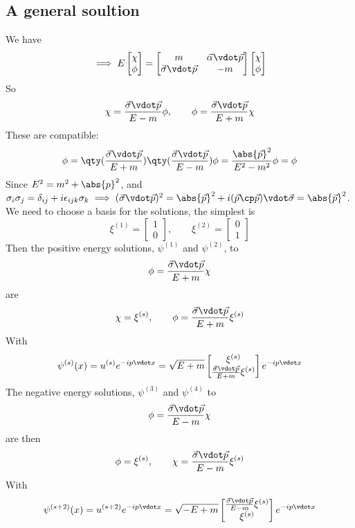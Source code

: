 \subsection{A general soultion}
\label{sec:general-soultion}
We have
\[ \implies E
\begin{bmatrix}
  \chi \\ \phi
\end{bmatrix}
=
\begin{bmatrix}
  m & \vec{\alpha} \vdot \vec{p} \\ \vec{\sigma} \vdot \vec{p} & -m
\end{bmatrix}
\begin{bmatrix}
  \chi \\ \phi
\end{bmatrix}
\]
So
\begin{equation*}
  \chi = \frac{\vec{\sigma} \vdot \vec{p}}{E-m} \phi, \qquad \phi = \frac{\vec{\sigma} \vdot \vec{p}}{E+m} \chi
\end{equation*}
These are compatible:
\begin{equation*}
  \phi = \qty( \frac{\vec{\sigma} \vdot \vec{p}}{E+m}) \qty( \frac{\vec{\sigma} \vdot \vec{p}}{E-m}) \phi = \frac{\abs{\vec{p}}^2}{E^2-m^2} \phi = \phi
\end{equation*}
Since $E^2 = m^2 + \abs{p}^2$, and $\sigma_i \sigma_j = \delta_{ij} +
i \epsilon_{ijk} \sigma_k \implies (\vec{\sigma} \vdot \vec{p})^2 =
\abs{\vec{p}}^2 + i (\vec{p} \cp \vec{p}) \vdot \vec{\sigma} =
\abs{\vec{p}}^2$.  We need to choose a basis for the solutions, the
simplest is
\begin{equation}
  \label{eq:90}
  \xi^{(1)} =
  \begin{bmatrix}
    1 \\ 0
  \end{bmatrix}, \qquad
\xi^{(2)} =
\begin{bmatrix}
  0 \\ 1
\end{bmatrix}
\end{equation}
Then the positive energy solutions, $\psi^{(1)}$ and $\psi^{(2)}$, to
\[ \phi = \frac{\vec{\sigma} \vdot \vec{p}}{E+m} \chi \]
are
\[ \chi = \xi^{(s)}, \qquad \phi = \frac{\vec{\sigma} \vdot \vec{p}}{E+m} \xi^{(s)} \]
With
\[ \psi^{(s)}(x) = u^{(s)} e^{-ip \vdot x} = \sqrt{E+m}
\begin{bmatrix}
  \xi^{(s)} \\ \frac{\vec{\sigma} \vdot \vec{p}}{E+m} \xi^{(s)}
\end{bmatrix}
e^{-ip \vdot x}
\]
The negative energy solutions, $\psi^{(3)}$ and $\psi^{(4)}$ to
\[ \phi = \frac{\vec{\sigma} \vdot \vec{p}}{E-m} \chi \]
are then 
\[ \phi = \xi^{(s)}, \qquad \chi = \frac{\vec{\sigma} \vdot \vec{p}}{E-m} \xi^{(s)} \]
With
\[ \psi^{(s+2)}(x) = u^{(s+2)} e^{-ip \vdot x} = \sqrt{-E+m}
\begin{bmatrix}
 \frac{\vec{\sigma} \vdot \vec{p}}{E-m} \xi^{(s)} \\   \xi^{(s)}
\end{bmatrix}
e^{-ip \vdot x}
\]

